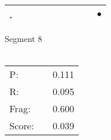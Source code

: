 \documentclass[landscape]{article}
\newcommand{\ssp}{\hspace{2pt}}
\newcommand{\mex}{\cellcolor{g}$\bullet$}
\begin{document}
\begin{tabular}{|l|p{10pt}|p{10pt}|p{10pt}|p{10pt}|p{10pt}|p{10pt}|p{10pt}|p{10pt}|p{10pt}|}
\hline
\ssp \cellcolor{ref8}. \ssp&\hspace{2pt}&\hspace{2pt}&\hspace{2pt}&\hspace{2pt}&\hspace{2pt}&\hspace{2pt}&\hspace{2pt}&\hspace{2pt}&\hspace{2pt}\mex\\
\hline
\end{tabular}

\vspace{6pt}
\noindent Segment 8\\\\
\noindent\begin{tabular}{lm{12pt}r}
\hline
P:&&0.111\\
R:&&0.095\\
Frag:&&0.600\\
Score:&&0.039\\
\end{tabular}

\newpage
\end{document}

